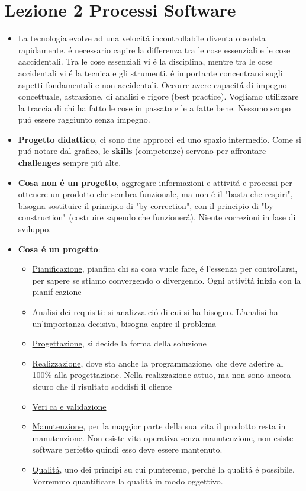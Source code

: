 \documentclass[10pt]{article}
\begin{document}
\section{Lezione 2 Processi Software}
\begin{itemize}
\item La tecnologia evolve ad una velocit\'a incontrollabile diventa obsoleta
rapidamente. \'e necessario capire la differenza tra le cose essenziali e le cose
aaccidentali. Tra le cose essenziali vi \'e la disciplina, mentre tra le cose
accidentali vi  \'e la tecnica e gli strumenti. \'e importante concentrarsi sugli
aspetti fondamentali e non accidentali. Occorre avere capacit\'a di impegno
concettuale, astrazione, di analisi e rigore (best practice). Vogliamo utilizzare
la traccia di chi ha fatto le cose in passato e le a fatte bene. Nessuno scopo
pu\'o essere raggiunto senza impegno.


\item \textbf{Progetto didattico}, ci sono due approcci ed uno spazio intermedio.
Come si pu\'o notare dal grafico, le \textbf{skills} (competenze) servono per
affrontare \textbf{challenges} sempre pi\'u alte.

\item \textbf{Cosa non \'e un progetto}, aggregare informazioni e attivit\'a e
processi per ottenere un prodotto che sembra funzionale, ma non \'e il "basta
che respiri", bisogna sostituire il principio di "by correction", con il principio
di "by construction" (costruire sapendo che funzioner\'a). Niente correzioni
in fase di sviluppo.

\item \textbf{Cosa \'e un progetto}:
	\begin{itemize}
	\item \underline{Pianificazione}, pianfica chi sa cosa vuole fare, \'e 
	l'essenza
	per controllarsi, per sapere se stiamo
		convergendo o divergendo. Ogni attivit\'a inizia con la pianifcazione
	\item \underline{Analisi dei requisiti}: si analizza ci\'o di cui si ha 
	bisogno.
	L'analisi ha un'importanza decisiva, bisogna
				capire il problema
				\item \underline{Progettazione}, si decide la forma della 
				soluzione
	\item \underline{Realizzazione}, dove sta anche la programmazione, che deve
	aderire al 100\% alla progettazione. Nella
	realizzazione attuo, ma non sono ancora sicuro che il risultato soddisfi il
	cliente
				\item \underline{Verica e validazione}
	\item \underline{Manutenzione}, per la maggior parte della sua vita il 
	prodotto
	resta in manutenzione. Non esiste vita
	operativa senza manutenzione, non esiste software perfetto quindi esso deve 
	essere
	mantenuto.
	\item \underline{Qualit\'a}, uno dei principi su cui punteremo, perch\'e la 
	qualit\'a \'e
	possibile. Vorremmo quantificare la	qualit\'a in modo oggettivo.
	\end{itemize}
	

\end{itemize}
\end{document}
